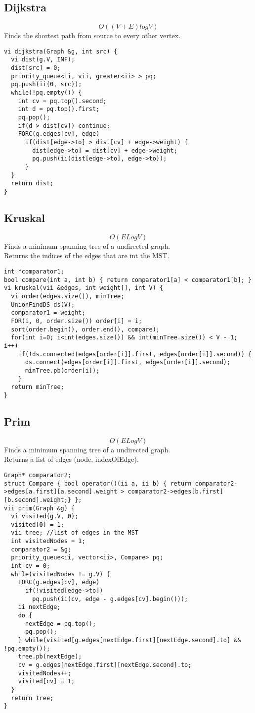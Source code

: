 \documentclass[11pt, oneside]{article}
\begin{document}
\subsection{Dijkstra}
\[O((V+E)logV)\]
Finds the shortest path from source to every other vertex.\\
\begin{lstlisting}
vi dijkstra(Graph &g, int src) {
  vi dist(g.V, INF);
  dist[src] = 0;
  priority_queue<ii, vii, greater<ii> > pq;
  pq.push(ii(0, src));
  while(!pq.empty()) {
    int cv = pq.top().second;
    int d = pq.top().first;
    pq.pop();
    if(d > dist[cv]) continue;
    FORC(g.edges[cv], edge)
      if(dist[edge->to] > dist[cv] + edge->weight) {
        dist[edge->to] = dist[cv] + edge->weight;
        pq.push(ii(dist[edge->to], edge->to));
      }
  }
  return dist;
}
\end{lstlisting}

\subsection{Kruskal}
\[O(ELogV)\]
Finds a minimum spanning tree of a undirected graph.\\
Returns the indices of the edges that are int the MST.\\
\begin{lstlisting}
int *comparator1;
bool compare(int a, int b) { return comparator1[a] < comparator1[b]; }
vi kruskal(vii &edges, int weight[], int V) {
  vi order(edges.size()), minTree;    
  UnionFindDS ds(V);
  comparator1 = weight;
  FOR(i, 0, order.size()) order[i] = i;
  sort(order.begin(), order.end(), compare);
  for(int i=0; i<int(edges.size()) && int(minTree.size()) < V - 1; i++)
    if(!ds.connected(edges[order[i]].first, edges[order[i]].second)) {
      ds.connect(edges[order[i]].first, edges[order[i]].second);
      minTree.pb(order[i]);
    }
  return minTree;
}
\end{lstlisting}

\subsection{Prim}
\[O(ELogV)\]
Finds a minimum spanning tree of a undirected graph.\\
Returns a list of edges (node, indexOfEdge).\\
\begin{lstlisting}
Graph* comparator2;
struct Compare { bool operator()(ii a, ii b) { return comparator2->edges[a.first][a.second].weight > comparator2->edges[b.first][b.second].weight;} };
vii prim(Graph &g) {
  vi visited(g.V, 0);
  visited[0] = 1;
  vii tree; //list of edges in the MST
  int visitedNodes = 1;
  comparator2 = &g;
  priority_queue<ii, vector<ii>, Compare> pq;
  int cv = 0;
  while(visitedNodes != g.V) {
    FORC(g.edges[cv], edge)
      if(!visited[edge->to])
        pq.push(ii(cv, edge - g.edges[cv].begin()));
    ii nextEdge;
    do {
      nextEdge = pq.top();
      pq.pop();
    } while(visited[g.edges[nextEdge.first][nextEdge.second].to] && !pq.empty());
    tree.pb(nextEdge);
    cv = g.edges[nextEdge.first][nextEdge.second].to;
    visitedNodes++;
    visited[cv] = 1;
  }
  return tree;
}
\end{lstlisting}
\end{document}
